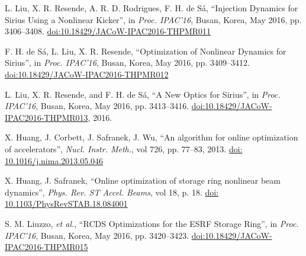 \documentclass[a4paper,
               keeplastbox,   %
               ]{jacow}
\begin{document}
	\begin{thebibliography}{9} %
	
        

        L. Liu, X. R. Resende, A. R. D. Rodrigues, F. H. de Sá,
       \textquotedblleft{{I}njection {D}ynamics for {S}irius {U}sing a {N}onlinear {K}icker}\textquotedblright,
       in \emph{Proc. IPAC’16}, Busan, Korea, May 2016, pp. 3406--3408.
       \url{doi:10.18429/JACoW-IPAC2016-THPMR011} 
 
        F. H. de Sá, L. Liu, X. R. Resende,
       \textquotedblleft{{O}ptimization of {N}onlinear {D}ynamics for {S}irius}\textquotedblright,
       in \emph{Proc. IPAC’16}, Busan, Korea, May 2016, pp. 3409--3412.
       \url{doi:10.18429/JACoW-IPAC2016-THPMR012}

       L. Liu, X. R. Resende, and F. H. de Sá,
       \textquotedblleft{A New Optics for Sirius}\textquotedblright,
     in \emph{Proc. IPAC'16}, Busan, Korea, May 2016, pp. 3413--3416.
       \url{doi:10.18429/JACoW-IPAC2016-THPMR013}, 2016.
           
		X. Huang, J. Corbett, J. Safranek, J. Wu,
		\textquotedblleft{An algorithm for online optimization of accelerators}\textquotedblright,
		\emph{Nucl.  Instr. Meth.}, vol 726, pp. 77--83, 2013.
        \url{doi: 10.1016/j.nima.2013.05.046}

		X. Huang, J. Safranek,
		\textquotedblleft{Online optimization of storage ring nonlinear beam dynamics}\textquotedblright,
		\emph{Phys. Rev. ST Accel. Beams}, vol 18, p. 18.
        \url{doi: 10.1103/PhysRevSTAB.18.084001} 
 
        S. M. Liuzzo, \emph{et al.},
        \textquotedblleft{RCDS Optimizations for the ESRF Storage Ring}\textquotedblright,
        in \emph{Proc. IPAC’16}, Busan, Korea, May 2016, pp. 3420--3423.
       \url{doi:10.18429/JACoW-IPAC2016-THPMR015}   
    

\end{thebibliography}
\end{document}
